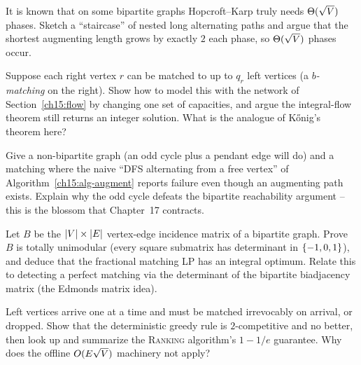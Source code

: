 \begin{exercise}
\label{ch15:ex-hk-tight}
It is known that on some bipartite graphs Hopcroft--Karp truly needs
$\Theta(\sqrt{V})$ phases. Sketch a ``staircase'' of nested long alternating paths and
argue that the shortest augmenting length grows by exactly $2$ each phase, so
$\Theta(\sqrt{V})$ phases occur.
\end{exercise}

\begin{exercise}
\label{ch15:ex-cap}
Suppose each right vertex $r$ can be matched to up to $q_r$ left vertices (a
\emph{$b$-matching} on the right). Show how to model this with the network of
Section~\ref{ch15:flow} by changing one set of capacities, and argue the
integral-flow theorem still returns an integer solution. What is the analogue of
K\H{o}nig's theorem here?
\end{exercise}

\begin{exercise}
\label{ch15:ex-blossom}
Give a non-bipartite graph (an odd cycle plus a pendant edge will do) and a
matching where the naive ``DFS alternating from a free vertex'' of
Algorithm~\ref{ch15:alg-augment} reports failure even though an augmenting path
exists. Explain why the odd cycle defeats the bipartite reachability argument --
this is the blossom that Chapter~17 contracts.
\end{exercise}

\begin{exercise}
\label{ch15:ex-incidence}
Let $B$ be the $\lvert V\rvert\times\lvert E\rvert$ vertex-edge incidence matrix of a bipartite
graph. Prove $B$ is totally unimodular (every square submatrix has determinant in
$\{-1,0,1\}$), and deduce that the fractional matching LP has an integral
optimum. Relate this to detecting a perfect matching via the determinant of the
bipartite biadjacency matrix (the Edmonds matrix idea).
\end{exercise}

\begin{exercise}
\label{ch15:ex-online}
Left vertices arrive one at a time and must be matched irrevocably on arrival, or
dropped. Show that the deterministic greedy rule is $2$-competitive and no
better, then look up and summarize the \textsc{Ranking} algorithm's $1-1/e$
guarantee. Why does the offline $O(E\sqrt{V})$ machinery not apply?
\end{exercise}
